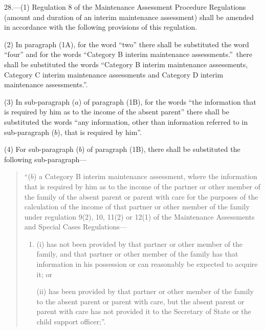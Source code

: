 \documentclass[12pt,a4paper]{article}
\begin{document}
28.—(1) Regulation 8 of the Maintenance Assessment Procedure Regulations (amount and duration of an interim maintenance assessment) shall be amended in accordance with the following provisions of this regulation.

(2) In paragraph (1A), for the word “two” there shall be substituted the word “four” and for the words “Category B interim maintenance assessments.”\ there shall be substituted the words “Category B interim maintenance assessments, Category C interim maintenance assessments and Category D interim maintenance assessments.”.

(3) In sub-paragraph ($a$) of paragraph (1B), for the words “the information that is required by him as to the income of the absent parent” there shall be substituted the words “any information, other than information referred to in sub-paragraph ($b$), that is required by him”.

(4) For sub-paragraph ($b$) of paragraph (1B), there shall be substituted the following sub-paragraph—
\begin{quotation}
“($b$) a Category B interim maintenance assessment, where the information that is required by him as to the income of the partner or other member of the family of the absent parent or parent with care for the purposes of the calculation of the income of that partner or other member of the family under regulation 9(2), 10, 11(2) or 12(1) of the Maintenance Assessments and Special Cases Regulations—
\begin{enumerate}\item[]
(i) has not been provided by that partner or other member of the family, and that partner or other member of the family has that information in his possession or can reasonably be expected to acquire it; or

(ii) has been provided by that partner or other member of the family to the absent parent or parent with care, but the absent parent or parent with care has not provided it to the Secretary of State or the child support officer;”.
\end{enumerate}
\end{quotation}
\end{document}
